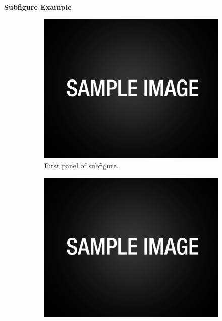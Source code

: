 \documentclass[12pt]{article}
\begin{document}
\noindent\textbf{Subfigure Example}

\begin{figure}[h]
	\begin{center}
	\captionsetup{labelformat=empty} %
		\begin{subfigure}[t]{0.3\textwidth}
			\centering
			\includegraphics[width=\textwidth]{sample.pdf}
			\caption{First panel of subfigure.}
			\label{fig:firstsubfigure}
		\end{subfigure}
		\quad	%
		\begin{subfigure}[t]{0.3\textwidth}
			\centering
			\includegraphics[width=\textwidth]{sample.pdf}

\end{subfigure}
\end{center}
\end{figure}
\end{document}
